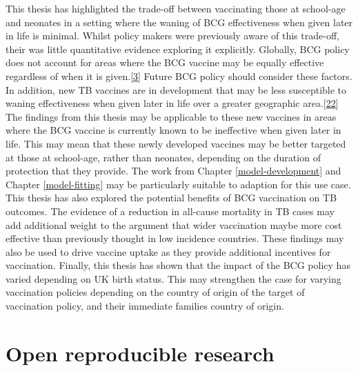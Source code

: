 \documentclass[11pt,twoside]{bristolthesis}
\begin{document}
  This thesis has highlighted the trade-off between vaccinating those at school-age and neonates in a setting where the waning of BCG effectiveness when given later in life is minimal. Whilst policy makers were previously aware of this trade-off, their was little quantitative evidence exploring it explicitly. Globally, BCG policy does not account for areas where the BCG vaccine may be equally effective regardless of when it is given.{[}\protect\hyperlink{ref-TheWorldHealthOrganization:2018va}{3}{]} Future BCG policy should consider these factors. In addition, new TB vaccines are in development that may be less susceptible to waning effectiveness when given later in life over a greater geographic area.{[}\protect\hyperlink{ref-Medicine2013}{22}{]} The findings from this thesis may be applicable to these new vaccines in areas where the BCG vaccine is currently known to be ineffective when given later in life. This may mean that these newly developed vaccines may be better targeted at those at school-age, rather than neonates, depending on the duration of protection that they provide. The work from Chapter \ref{model-development} and Chapter \ref{model-fitting} may be particularly suitable to adaption for this use case. This thesis has also explored the potential benefits of BCG vaccination on TB outcomes. The evidence of a reduction in all-cause mortality in TB cases may add additional weight to the argument that wider vaccination maybe more cost effective than previously thought in low incidence countries. These findings may also be used to drive vaccine uptake as they provide additional incentives for vaccination. Finally, this thesis has shown that the impact of the BCG policy has varied depending on UK birth status. This may strengthen the case for varying vaccination policies depending on the country of origin of the target of vaccination policy, and their immediate families country of origin.
  
  \hypertarget{open-reproducible-research}{%
  \section{Open reproducible research}\label{open-reproducible-research}}
  
\end{document}
